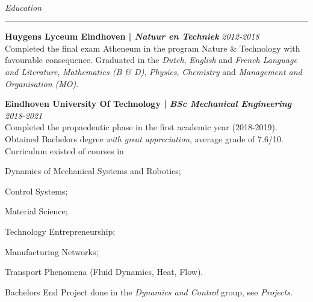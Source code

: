 \documentclass[12pt]{article}
\begin{document}
\hfill\\

\textit{\huge{Education}} \\
\noindent\hfil\rule{\textwidth}{.4pt}\hfil

\textbf{Huygens Lyceum Eindhoven | \textit{Natuur en Techniek}} \hfill \textit{2012-2018}\\
Completed the final exam Atheneum in the program Nature \& Technology with favourable consequence. Graduated in the \textit{Dutch}, \textit{English} and \textit{French Language and Literature}, \textit{Mathematics (B \& D)}, \textit{Physics}, \textit{Chemistry} and \textit{Management and Organisation (MO)}.
\vspace{0.5cm}


\textbf{Eindhoven University Of Technology | \textit{BSc Mechanical Engineering}} \hfill \textit{2018-2021}\\
Completed the propaedeutic phase in the first academic year (2018-2019). Obtained Bachelors degree \textit{with great appreciation}, average grade of 7.6/10. Curriculum existed of courses in
\begin{compactitem}
    \item Dynamics of Mechanical Systems and Robotics;
    \item Control Systems;
    \item Material Science;
    \item Technology Entrepreneurship;
    \item Manufacturing Networks;
    \item Transport Phenomena (Fluid Dynamics, Heat, Flow).
\end{compactitem}
Bachelors End Project done in the \textit{Dynamics and Control} group, see \textit{Projects}.

\vspace{0.5cm}
\end{document}
